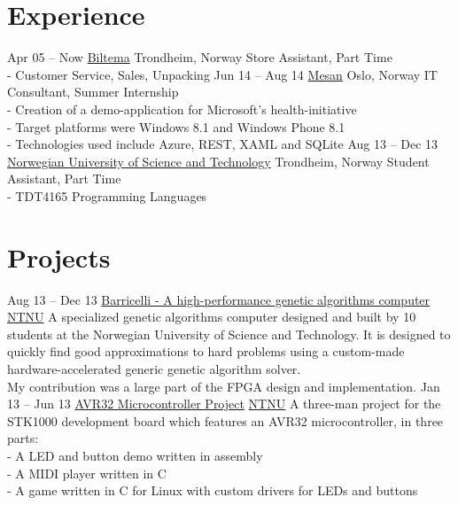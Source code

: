 \documentclass[print]{friggeri-cv}
\begin{document}
\section{Experience}

\begin{entrylist}
    \entry
        {Apr 05 – Now}
        {\href{http://biltema.no/}{Biltema}}
        {Trondheim, Norway}
        {Store Assistant, Part Time\\
        - Customer Service, Sales, Unpacking}
    \entry
        {Jun 14 – Aug 14}
        {\href{http://mesan.no/}{Mesan}}
        {Oslo, Norway}
        {IT Consultant, Summer Internship\\
         - Creation of a demo-application for Microsoft's health-initiative\\
         - Target platforms were Windows 8.1 and Windows Phone 8.1\\
         - Technologies used include Azure, REST, XAML and SQLite}
    \entry
        {Aug 13 – Dec 13}
        {\href{http://ntnu.no/}{Norwegian University of Science and Technology}}
        {Trondheim, Norway}
        {Student Assistant, Part Time\\
        - TDT4165 Programming Languages}
\end{entrylist}

\section{Projects}

\begin{entrylist}
    \entry
        {Aug 13 – Dec 13}
        {\href{http://barricel.li/}{Barricelli - A high-performance genetic algorithms computer}}
        {\href{http://ntnu.no/}{NTNU}}
        {A specialized genetic algorithms computer designed and built by 10 students at the Norwegian University of Science and Technology. It is designed to quickly find good approximations to hard problems using a custom-made hardware-accelerated generic genetic algorithm solver.\\
        My contribution was a large part of the FPGA design and implementation.}
    \entry
        {Jan 13 – Jun 13}
        {\href{https://github.com/lundal/avr32-project-2013}{AVR32 Microcontroller Project}}
        {\href{http://ntnu.no/}{NTNU}}
        {A three-man project for the STK1000 development board which features an AVR32 microcontroller, in three parts:\\
        - A LED and button demo written in assembly\\
        - A MIDI player written in C\\
        - A game written in C for Linux with custom drivers for LEDs and buttons}
\end{entrylist}
\end{document}
